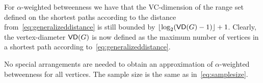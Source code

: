 For $\alpha$-weighted betweenness we have that the VC-dimension of the range set
defined on the shortest paths according to the distance
from~\eqref{eq:generalizeddistance} is still bounded by
$\lfloor\log_2(\mathsf{VD}(G)-1)\rfloor+1$. Clearly, the vertex-diameter $\mathsf{VD}(G)$ is now
defined as the maximum number of vertices in a shortest path according
to~\eqref{eq:generalizeddistance}.

No special arrangements are needed to obtain an approximation of
$\alpha$-weighted betweenness for all vertices. The sample size is the same as in~\eqref{eq:samplesize}.

%
%


